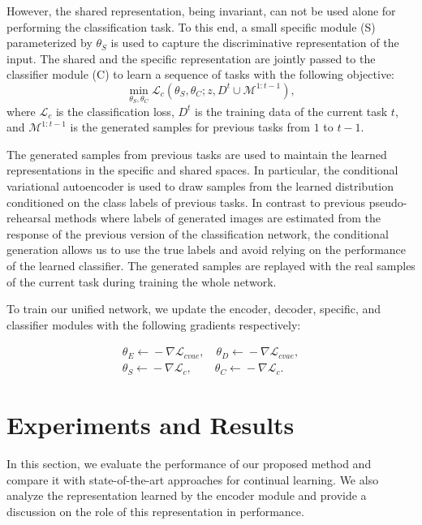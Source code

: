 \documentclass[letterpaper]{article} %
\begin{document}
However, the shared representation, being invariant, can not be used alone for performing the classification task. To this end, a small specific module (S) parameterized by $\theta_{S}$ is used to capture the discriminative representation of the input. The shared and the specific representation are jointly passed to the classifier module (C) to learn a sequence of tasks with the following objective:
\begin{equation}
 \min_{\theta_{S},\theta_{C}} \mathcal{L}_{c} (\theta_{S},\theta_{C};z, D^{t} \cup \mathcal{M}^{1:t-1}),
\label{classification_loss}
\end{equation}
where $\mathcal{L}_{c}$ is the classification loss, $D^{t}$ is the training data of the current task $t$, and $\mathcal{M}^{1:t-1}$ is the generated samples for previous tasks from $1$ to $t-1$.

The generated samples from previous tasks are used to maintain the learned representations in the specific and shared spaces. In particular, the conditional variational autoencoder is used to draw samples from the learned distribution conditioned on the class labels of previous tasks. In contrast to previous pseudo-rehearsal methods where labels of generated images are estimated from the response of the previous version of the classification network, the conditional generation allows us to use the true labels and avoid relying on the performance of the learned classifier. The generated samples are replayed with the real samples of the current task during training the whole network.

To train our unified network, we update the encoder, decoder, specific, and classifier modules with the following gradients respectively:

\begin{equation}
\label{gradient}
\begin{split}
  \theta_{E} \xleftarrow{} - \nabla \mathcal{L}_{cvae}, \quad
  \theta_{D} \xleftarrow{} - \nabla \mathcal{L}_{cvae},\\
  \theta_{S} \xleftarrow{} - \nabla \mathcal{L}_{c}, \quad \quad
  \theta_{C} \xleftarrow{} - \nabla \mathcal{L}_{c}.
\end{split}
\end{equation}


\section{Experiments and Results}
In this section, we evaluate the performance of our proposed method and compare it with state-of-the-art approaches for continual learning. We also analyze the representation learned by the encoder module and provide a discussion on the role of this representation in performance.
\end{document}

